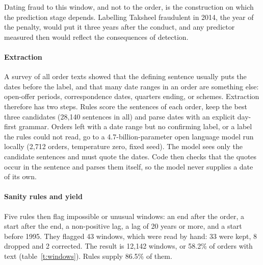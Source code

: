 \documentclass[letterpaper,11pt,leqno]{article}
\begin{document}
Dating fraud to this window, and not to the order, is the construction on which the prediction stage depends. Labelling Taksheel fraudulent in 2014, the year of the penalty, would put it three years after the conduct, and any predictor measured then would reflect the consequences of detection.

\paragraph{Extraction} A survey of all order texts showed that the defining sentence usually puts the dates before the label, and that many date ranges in an order are something else: open-offer periods, correspondence dates, quarters ending, or schemes. Extraction therefore has two steps. Rules score the sentences of each order, keep the best three candidates (28,140 sentences in all) and parse dates with an explicit day-first grammar. Orders left with a date range but no confirming label, or a label the rules could not read, go to a 4.7-billion-parameter open language model run locally (2,712 orders, temperature zero, fixed seed). The model sees only the candidate sentences and must quote the dates. Code then checks that the quotes occur in the sentence and parses them itself, so the model never supplies a date of its own.

\paragraph{Sanity rules and yield} Five rules then flag impossible or unusual windows: an end after the order, a start after the end, a non-positive lag, a lag of 20 years or more, and a start before 1995. They flagged 43 windows, which were read by hand: 33 were kept, 8 dropped and 2 corrected. The result is 12,142 windows, or 58.2\% of orders with text (table~\ref{t:windows}). Rules supply 86.5\% of them.

\begin{table}[t]
\caption{Violation windows}

\label{t:windows}\end{table}
\end{document}
